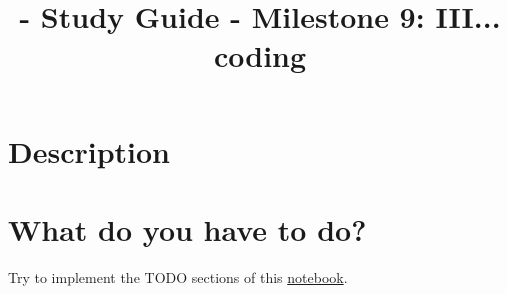 
\title{\SM{} - Study Guide - Milestone 9: III... coding}

\maketitle

\tableofcontents

\section{Description}



\section{What do you have to do?}

Try to implement the TODO sections of this \href{https://github.com/Sistemas-Multimedia/Sistemas-Multimedia.github.io/blob/master/milestones/09-III_coding/III_compression.ipynb}{notebook}.

